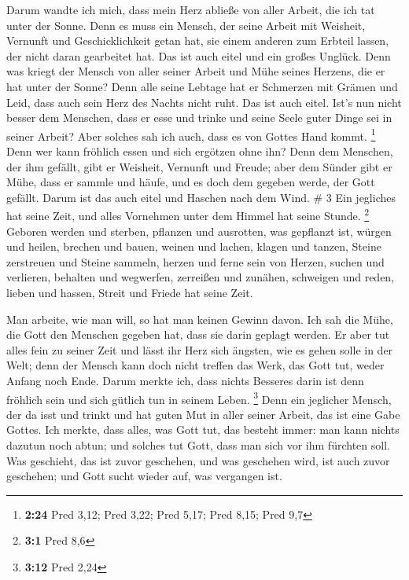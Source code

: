  Darum wandte ich mich, dass mein Herz abließe von aller
Arbeit, die ich tat unter der Sonne.  Denn es muss ein
Mensch, der seine Arbeit mit Weisheit, Vernunft und Geschicklichkeit
getan hat, sie einem anderen zum Erbteil lassen, der nicht daran
gearbeitet hat. Das ist auch eitel und ein großes Unglück. 
Denn was kriegt der Mensch von aller seiner Arbeit und Mühe seines
Herzens, die er hat unter der Sonne?  Denn alle seine
Lebtage hat er Schmerzen mit Grämen und Leid, dass auch sein Herz des
Nachts nicht ruht. Das ist auch eitel.  Ist's nun nicht
besser dem Menschen, dass er esse und trinke und seine Seele guter Dinge
sei in seiner Arbeit? Aber solches sah ich auch, dass es von Gottes Hand
kommt. \footnote{\textbf{2:24} Pred 3,12; Pred 3,22; Pred 5,17; Pred
  8,15; Pred 9,7}  Denn wer kann fröhlich essen und sich
ergötzen ohne ihn?  Denn dem Menschen, der ihm gefällt,
gibt er Weisheit, Vernunft und Freude; aber dem Sünder gibt er Mühe,
dass er sammle und häufe, und es doch dem gegeben werde, der Gott
gefällt. Darum ist das auch eitel und Haschen nach dem Wind. \# 3
 Ein jegliches hat seine Zeit, und alles Vornehmen unter dem
Himmel hat seine Stunde. \footnote{\textbf{3:1} Pred 8,6} 
Geboren werden und sterben, pflanzen und ausrotten, was gepflanzt ist,
 würgen und heilen, brechen und bauen,  weinen
und lachen, klagen und tanzen,  Steine zerstreuen und Steine
sammeln, herzen und ferne sein von Herzen,  suchen und
verlieren, behalten und wegwerfen,  zerreißen und zunähen,
schweigen und reden,  lieben und hassen, Streit und Friede
hat seine Zeit.

 Man arbeite, wie man will, so hat man keinen Gewinn davon.
 Ich sah die Mühe, die Gott den Menschen gegeben hat, dass
sie darin geplagt werden.  Er aber tut alles fein zu seiner
Zeit und lässt ihr Herz sich ängsten, wie es gehen solle in der Welt;
denn der Mensch kann doch nicht treffen das Werk, das Gott tut, weder
Anfang noch Ende.  Darum merkte ich, dass nichts Besseres
darin ist denn fröhlich sein und sich gütlich tun in seinem Leben.
\footnote{\textbf{3:12} Pred 2,24}  Denn ein jeglicher
Mensch, der da isst und trinkt und hat guten Mut in aller seiner Arbeit,
das ist eine Gabe Gottes.  Ich merkte, dass alles, was Gott
tut, das besteht immer: man kann nichts dazutun noch abtun; und solches
tut Gott, dass man sich vor ihm fürchten soll.  Was
geschieht, das ist zuvor geschehen, und was geschehen wird, ist auch
zuvor geschehen; und Gott sucht wieder auf, was vergangen ist.

